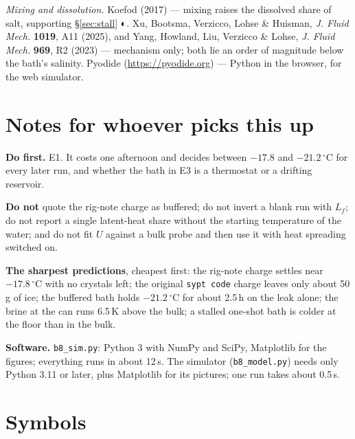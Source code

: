 \documentclass[11pt,a4paper]{article}
\newcommand{\dC}{\,^{\circ}\mathrm{C}}
\newcommand{\code}[1]{\texttt{#1}}
\newcommand{\secsrc}{{\symfont ◐}}
\begin{document}
\emph{Mixing and dissolution.} Koefod (2017) — mixing raises the dissolved share of salt, supporting
§\ref{sec:stall} \secsrc. Xu, Bootsma, Verzicco, Lohse \& Huisman, \emph{J. Fluid Mech.} \textbf{1019}, A11
(2025), and Yang, Howland, Liu, Verzicco \& Lohse, \emph{J. Fluid Mech.} \textbf{969}, R2 (2023) —
mechanism only; both lie an order of magnitude below the bath's salinity. Pyodide
(\url{https://pyodide.org}) — Python in the browser, for the web simulator.

\section{Notes for whoever picks this up}

\textbf{Do first.} E1. It costs one afternoon and decides between $-17.8$ and $-21.2\dC$ for
every later run, and whether the bath in E3 is a thermostat or a drifting reservoir.

\textbf{Do not} quote the rig-note charge as buffered; do not invert a blank run with $L_f$;
do not report a single latent-heat share without the starting temperature of the water; and do not
fit $U$ against a bulk probe and then use it with heat spreading switched on.

\textbf{The sharpest predictions}, cheapest first: the rig-note charge settles near $-17.8\dC$
with no crystals left; the original \code{sypt code} charge leaves only about 50\,g of ice;
the buffered bath holds $-21.2\dC$ for about 2.5\,h on the leak alone; the brine at the can runs
6.5\,K above the bulk; a stalled one-shot bath is colder at the floor than in the bulk.

\textbf{Software.} \code{b8\_sim.py}: Python 3 with NumPy and SciPy, Matplotlib for the figures;
everything runs in about 12\,s. The simulator (\code{b8\_model.py}) needs only Python 3.11 or later,
plus Matplotlib for its pictures; one run takes about 0.5\,s.

\appendix
\section{Symbols}
\label{sec:symbols}
\end{document}
